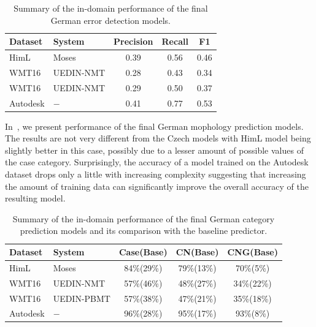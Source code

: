 \begin{table}[t]
\centering
\small

\begin{tabular}{ll|ccc}
Dataset  &  System  &  Precision  &  Recall  &  F1  \\
\hline
HimL  &  Moses  &  0.39  &  0.56  &  0.46  \\
WMT16 &  UEDIN-NMT  &  0.28  &  0.43  &  0.34  \\
WMT16 &  UEDIN-NMT  &  0.29  &  0.50  &  0.37  \\
Autodesk  &  $-$  &  0.41  &  0.77  &  0.53  \\
\end{tabular}
\caption[Model summary (German) - error detection]{
    Summary of the in-domain performance of the final German error detection models.
}
\label{wf_de-summary}
\end{table}

In~, we present performance of the final German
mophology prediction models. The results are not very different from the Czech models with
HimL model being slightly better in this case, possibly due to a lesser amount of possible values
of the case category. Surprisingly, the accuracy of  a model trained on the Autodesk
dataset drops only a little with increasing complexity suggesting that increasing
the amount of training data can significantly improve the overall accuracy of the
resulting model.

\begin{table}[t]
\centering
\small

\begin{tabular}{ll|ccc}
Dataset  &  System  &  Case(Base)  &  CN(Base)  & CNG(Base)  \\
\hline
HimL  &  Moses  &  84\%(29\%)  &  79\%(13\%)  &  70\%(5\%)  \\
WMT16  &  UEDIN-NMT  &  57\%(46\%)  &  48\%(27\%)  &  34\%(22\%)  \\
WMT16  &  UEDIN-PBMT  &  57\%(38\%)  &  47\%(21\%)  &  35\%(18\%)\\
Autodesk  &  $-$  &  96\%(28\%)  &  95\%(17\%)  &  93\%(8\%)  \\

\end{tabular}
\caption[Model summary (German) - morphological prediction]{
    Summary of the in-domain performance of the final German category prediction models
	and its comparison with the baseline predictor.
}
\label{cats_de-summary}
\end{table}

